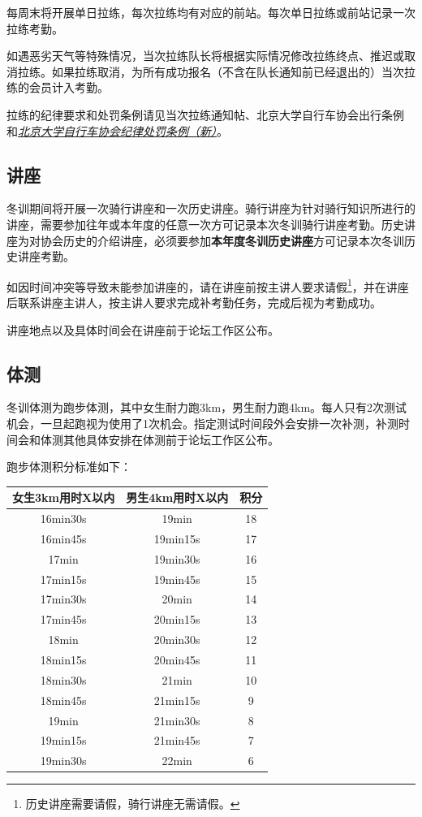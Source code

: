 \documentclass[UTF8]{ctexart}
\begin{document}
每周末将开展单日拉练，每次拉练均有对应的前站。每次单日拉练或前站记录一次拉练考勤。

如遇恶劣天气等特殊情况，当次拉练队长将根据实际情况修改拉练终点、推迟或取消拉练。如果拉练取消，为所有成功报名（不含在队长通知前已经退出的）当次拉练的会员计入考勤。

拉练的纪律要求和处罚条例请见当次拉练通知帖、北京大学自行车协会出行条例%
和\href{https://chexie.net/bbs/content/?bid=1&tid=9260&p=1}{\textit{北京大学自行车协会纪律处罚条例（新）}}。

\subsection{讲座}


冬训期间将开展一次骑行讲座和一次历史讲座。骑行讲座为针对骑行知识所进行的讲座，需要参加往年或本年度的任意一次方可记录本次冬训骑行讲座考勤。历史讲座为对协会历史的介绍讲座，必须要参加\textbf{本年度冬训历史讲座}方可记录本次冬训历史讲座考勤。

如因时间冲突等导致未能参加讲座的，请在讲座前按主讲人要求请假\footnote{历史讲座需要请假，骑行讲座无需请假。}，并在讲座后联系讲座主讲人，按主讲人要求完成补考勤任务，完成后视为考勤成功。

讲座地点以及具体时间会在讲座前于论坛工作区公布。

\subsection{体测}

冬训体测为跑步体测，其中女生耐力跑3km，男生耐力跑4km。每人只有2次测试机会，一旦起跑视为使用了1次机会。指定测试时间段外会安排一次补测，补测时间会和体测其他具体安排在体测前于论坛工作区公布。

跑步体测积分标准如下：

\begin{table}[h]
    \centering
    \begin{tabular}{|c|c|c|}
    \hline
    女生3km用时X以内 & 男生4km用时X以内 & 积分 \\ \hline
    16min30s   & 19min      & 18 \\ \hline
    16min45s   & 19min15s   & 17 \\ \hline
    17min      & 19min30s   & 16 \\ \hline
    17min15s   & 19min45s   & 15 \\ \hline
    17min30s   & 20min      & 14 \\ \hline
    17min45s   & 20min15s   & 13 \\ \hline
    18min      & 20min30s   & 12 \\ \hline
    18min15s   & 20min45s   & 11 \\ \hline
    18min30s   & 21min      & 10 \\ \hline
    18min45s   & 21min15s   & 9  \\ \hline
    19min      & 21min30s   & 8  \\ \hline
    19min15s   & 21min45s   & 7  \\ \hline
    19min30s   & 22min      & 6  \\ \hline
    \end{tabular}\label{test}
    \end{table}
\end{document}
